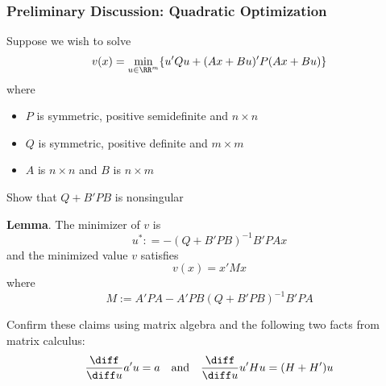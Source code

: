 \begin{frame}
    \frametitle{Preliminary Discussion: Quadratic Optimization}
    
    Suppose we wish to solve 
    \begin{equation*}
        \label{eq:cqp}
        v(x) = \min_{u \in \RR^m} \{ u'Qu + (Ax + Bu)'P(Ax + Bu)  \} 
    \end{equation*}
    where
    \begin{itemize}
        \item $P$ is symmetric, positive semidefinite and $n \times n$
            \vspace{0.5em}
        \item $Q$ is symmetric, positive definite and $m \times m$
            \vspace{0.5em}
        \item $A$ is $n \times n$ and $B$ is $n \times m$ 
    \end{itemize}

            \vspace{0.5em}
            \vspace{0.5em}

    \Ex Show that $Q + B'PB$ is nonsingular

\end{frame}


\begin{frame}
    
    \textbf{Lemma}. The minimizer of $v$  is 
    \begin{equation*}
        u^* : = -(Q + B'PB)^{-1}B'PAx
    \end{equation*}
    and the minimized value $v$ satisfies
    \begin{equation*}
        \label{eq:vmv}
        v(x) = x' M x 
    \end{equation*}
    where
    \begin{equation*}
        M := A'PA - A'PB(Q + B'PB)^{-1}B'PA
    \end{equation*}

    \Ex Confirm these claims using matrix algebra and the
    following two facts from matrix calculus:
    \begin{equation*}
        \frac{\diff}{\diff u} a'u = a 
        \quad \text{and} \quad
        \frac{\diff}{\diff u} u' H u = (H + H')u
    \end{equation*}

\end{frame}




